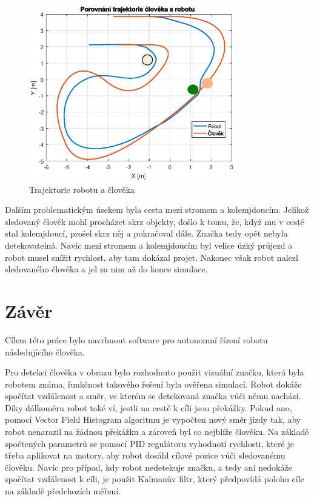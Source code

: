 \documentclass[twoside]{ctuthesis}
\theoremstyle{plain}
\theoremstyle{definition}
\theoremstyle{note}
\begin{document}
\begin{figure}[H]
	\caption{Trajektorie robotu a člověka}

	\label{trajektorie}
	\includegraphics[width=0.8\textwidth]{images/5/trajek.eps}
\end{figure}
Dalším problematickým úsekem byla cesta mezi stromem a kolemjdoucím. Jelikož sledovaný člověk mohl procházet skrz objekty, došlo k tomu, že, když mu v cestě stal kolemjdoucí, prošel skrz něj a pokračoval dále. Značka tedy opět nebyla detekovatelná. Navíc mezi stromem a kolemjdoucím byl velice úzký průjezd a robot musel snížit rychlost, aby tam dokázal projet. Nakonec však robot nalezl sledovaného člověka a jel za nim až do konce simulace.
\chapter{Závěr}

Cílem této práce bylo navrhnout software pro autonomní řízení robotu následujícího člověka.

Pro detekci člověka v obrazu bylo rozhodnuto použit vizuální značku, která byla robotem známa, funkčnost takového řešení byla ověřena simulací. Robot dokáže spočítat vzdálenost a směr, ve kterém se detekovaná značka vůči němu nachází. Díky dálkoměru robot také ví, jestli na cestě k cíli jsou překážky. Pokud ano, pomocí Vector Field Histogram algoritmu je vypočten nový směr jízdy tak, aby robot nenarazil na žádnou překážku a zároveň byl co nejblíže člověku. Na základě spočtených parametrů se pomocí PID regulátoru vyhodnotí rychlosti, které je třeba aplikovat na motory, aby robot dosáhl cílové pozice vůči sledovanému člověku. Navíc pro případ, kdy robot nedetekuje značku, a tedy ani nedokáže spočítat vzdálenost k cíli, je použit Kalmanův filtr, který předpovídá polohu cíle na základě předchozích měření.
\end{document}
